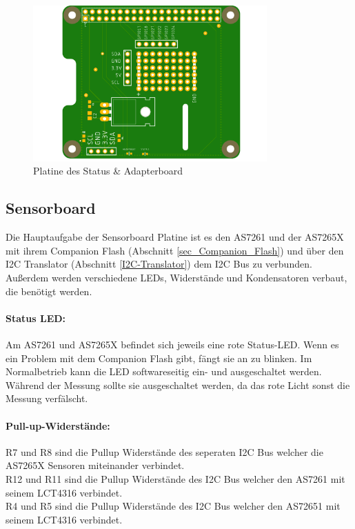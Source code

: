 \begin{figure}[H]
\centering
\includegraphics[width=0.8\textwidth]{img/pi-shield}
\caption{Platine des Status \& Adapterboard}
\label{fig:Adapter-Shield}
\end{figure}
\subsection{Sensorboard}
Die Hauptaufgabe der Sensorboard Platine ist es den AS7261 und der AS7265X mit ihrem Companion Flash (Abschnitt \ref{sec_Companion_Flash}) und über den I2C Translator (Abschnitt \ref{I2C-Translator}) dem I2C Bus zu verbunden.
Außerdem werden verschiedene LEDs, Widerstände und Kondensatoren verbaut, die benötigt werden.


\paragraph{Status LED:} Am AS7261 und AS7265X befindet sich je­weils eine rote Status-LED. Wenn es ein Problem mit dem Companion Flash gibt, fängt sie an zu blinken. Im Normalbetrieb kann die LED softwareseitig ein- und ausgeschaltet werden.
	Während der Messung sollte sie ausgeschaltet werden, da das rote Licht sonst die Messung verfälscht.

\paragraph{Pull-up-Widerstände:}
R7 und R8 sind die Pullup Widerstände des seperaten I2C Bus welcher die AS7265X Sensoren miteinander verbindet.\\
R12 und R11 sind die Pullup Widerstände des I2C Bus welcher den AS7261 mit seinem LCT4316 verbindet.\\
R4 und R5 sind die Pullup Widerstände des I2C Bus welcher den AS72651 mit seinem LCT4316 verbindet.

